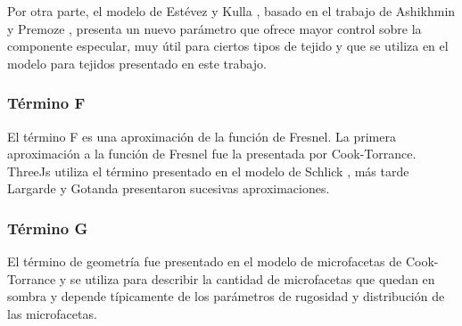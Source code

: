                 Por otra parte, el modelo de Est\'evez y Kulla \autocite{sheenbrdf}, basado en el trabajo de Ashikhmin y Premoze \autocite{ashikhmin00},
                presenta un nuevo par\'ametro que ofrece mayor control sobre la componente especular, muy \'util para ciertos tipos de
                tejido y que se utiliza en el modelo para tejidos presentado en este trabajo.\\


            

            \subsubsection*{T\'ermino F}
                El t\'ermino F es una aproximaci\'on de la funci\'on de Fresnel. La primera aproximaci\'on a la funci\'on de Fresnel
                fue la presentada por Cook-Torrance. ThreeJs utiliza el t\'ermino presentado en el modelo de Schlick \autocite{schlick},
                m\'as tarde Largarde \autocite{frostbite} y Gotanda \autocite{gotanda} presentaron sucesivas aproximaciones.

            \subsubsection*{T\'ermino G}
                El t\'ermino de geometr\'ia fue presentado en el modelo de microfacetas de Cook-Torrance \autocite{cooktorrance}
                y se utiliza para describir la cantidad de microfacetas que quedan en sombra y depende t\'ipicamente de los par\'ametros
                de rugosidad y distribuci\'on de las microfacetas.\\
                
